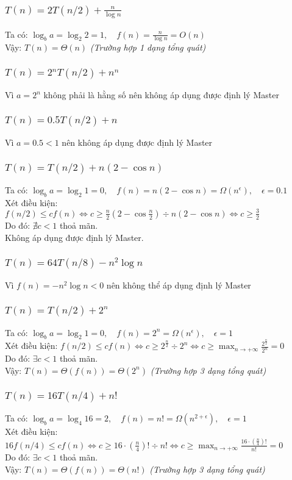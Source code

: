 \subsubsection{$T(n) = 2T(n/2) +\frac{n}{\log n}$}
Ta có: $\log_b a = \log_2 2 = 1 , \quad f(n) = \frac{n}{\log n} = O(n) $ \\
Vậy: $T(n) = \Theta(n)$ \textit{(Trường hợp 1 dạng tổng quát)}
\subsubsection{$T(n) = 2^nT(n/2) +n^n$}
Vì $a = 2^n$ không phải là hằng số nên không áp dụng được định lý Master
\subsubsection{$T(n) = 0.5T(n/2) + n$}
Vì $a = 0.5 < 1$ nên không áp dụng được định lý Master
\subsubsection{$T(n) = T(n/2) + n(2 - \cos n)$}
Ta có: $\log_b a = \log_2 1 = 0 , \quad f(n) = n(2 - \cos n) = \Omega(n^{\epsilon}),\quad \epsilon = 0.1 $ \\
Xét điều kiện: $f(n/2) \leq cf(n) \Leftrightarrow c \geq \frac{n}{2}(2 - \cos \frac{n}{2}) \div n(2 - \cos n) \Leftrightarrow c \geq \frac{3}{2}$\\ Do đó: $\nexists c < 1$ thoả mãn. \\
Không áp dụng được định lý Master.
\subsubsection{$T(n) = 64T(n/8) - n^2 \log n$}
Vì $f(n) = -n^2 \log n < 0$ nên không thể áp dụng định lý Master
\subsubsection{$T(n) = T(n/2) + 2^n$}
Ta có: $\log_b a = \log_2 1 = 0 , \quad f(n) = 2^n = \Omega(n^{\epsilon}),\quad \epsilon = 1 $ \\
Xét điều kiện: $\displaystyle f(n/2) \leq cf(n) \Leftrightarrow c \geq 2^{\frac{n}{2}} \div 2^n \Leftrightarrow c \geq \max_{n \to +\infty} \frac{2^{\frac{n}{2}}}{2^n} = 0$\\ Do đó: $\exists c < 1$ thoả mãn. \\
Vậy: $T(n) = \Theta(f(n)) = \Theta(2^n)$ \emph{(Trường hợp 3 dạng tổng quát)}
\subsubsection{$T(n) = 16T(n/4) + n!$}
Ta có: $\log_b a = \log_4 16 = 2 , \quad f(n) = n! = \Omega(n^{2+\epsilon}),\quad \epsilon = 1 $ \\
Xét điều kiện: $\displaystyle 16f(n/4) \leq cf(n) \Leftrightarrow c \geq 16\cdot \left(\frac{n}{4}\right)! \div n! \Leftrightarrow c \geq \max_{n \to +\infty} \frac{16\cdot \left(\frac{n}{4}\right)!}{n!} = 0$\\ Do đó: $\exists c < 1$ thoả mãn. \\
Vậy: $T(n) = \Theta(f(n)) = \Theta(n!)$ \emph{(Trường hợp 3 dạng tổng quát)}